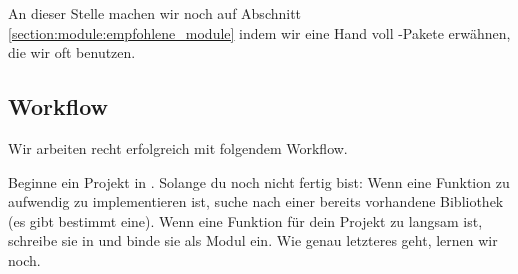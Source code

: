 An dieser Stelle machen wir noch auf Abschnitt \ref{section:module:empfohlene_module} indem wir eine Hand voll \Python-Pakete erwähnen, die wir oft benutzen.


\subsection{Workflow}
\label{section:crashkurs:workflow}
Wir arbeiten recht erfolgreich mit folgendem Workflow.

Beginne ein Projekt in \Python.
Solange du noch nicht fertig bist:
Wenn eine Funktion zu aufwendig zu implementieren ist, suche nach einer bereits vorhandene \Python Bibliothek (es gibt bestimmt eine).
Wenn eine Funktion für dein Projekt zu langsam ist, schreibe sie in \CC und binde sie als Modul ein.
Wie genau letzteres geht, lernen wir noch.
